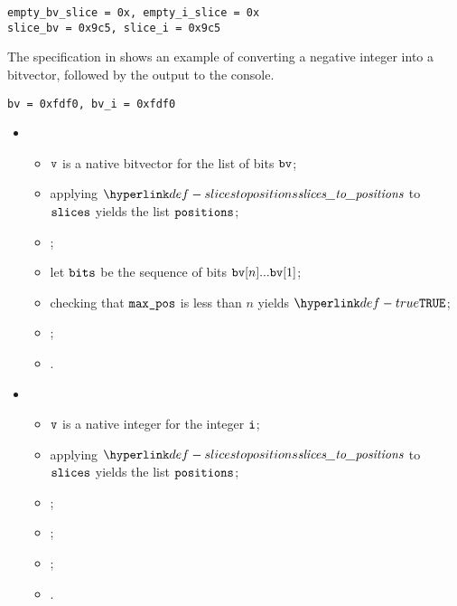 \begin{Verbatim}[fontsize=\footnotesize, frame=single]
empty_bv_slice = 0x, empty_i_slice = 0x
slice_bv = 0x9c5, slice_i = 0x9c5
\end{Verbatim}

The specification in  shows an example of converting a negative
integer into a bitvector, followed by the output to the console.

\begin{Verbatim}[fontsize=\footnotesize, frame=single]
bv = 0xfdf0, bv_i = 0xfdf0
\end{Verbatim}

\ProseParagraph
\OneApplies
\begin{itemize}
  \item {}
  \begin{itemize}
    \item $\texttt{v}$ is a native bitvector for the list of bits $\texttt{bv}$;
    \item applying $\slicestopositions$ to $\texttt{slices}$ yields the list $\texttt{positions}$\ProseOrError;
    \item {};
    \item let $\texttt{bits}$ be the sequence of bits $\texttt{bv}[n] ... \texttt{bv}[1]$;
    \item checking that $\texttt{max\_pos}$ is less than $n$ yields $\True$\ProseTerminateAs{\BadIndex};
    \item {};
    \item {}.
  \end{itemize}

  \item {}
  \begin{itemize}
    \item $\texttt{v}$ is a native integer for the integer $\texttt{i}$;
    \item applying $\slicestopositions$ to $\texttt{slices}$ yields the list $\texttt{positions}$\ProseOrError;
    \item {};
    \item {};
    \item {};
    \item {}.
  \end{itemize}
\end{itemize}

